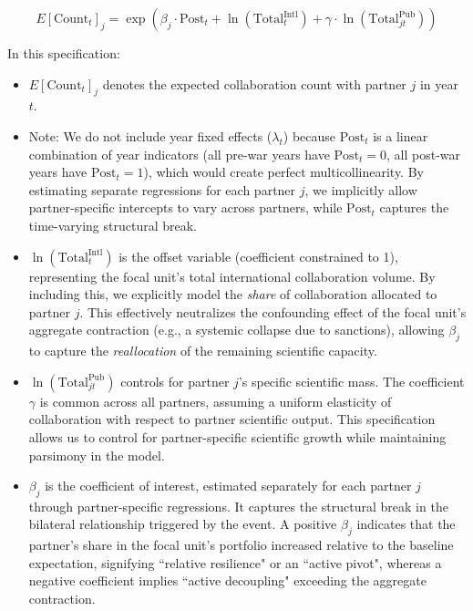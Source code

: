 \begin{equation}\label{eq:gravity_separate}
E[\text{Count}_{t}]_j = \exp\left( \beta_j \cdot \text{Post}_t + \ln(\text{Total}^{\text{Intl}}_{t}) + \gamma \cdot \ln(\text{Total}^{\text{Pub}}_{jt})  \right)
\end{equation}

In this specification:

\begin{itemize}
\item $E[\text{Count}_{t}]_j$ denotes the expected collaboration count with partner $j$ in year $t$.

\item Note: We do not include year fixed effects ($\lambda_t$) because $\text{Post}_t$ is a linear combination of year indicators (all pre-war years have $\text{Post}_t=0$, all post-war years have $\text{Post}_t=1$), which would create perfect multicollinearity. By estimating separate regressions for each partner $j$, we implicitly allow partner-specific intercepts to vary across partners, while $\text{Post}_t$ captures the time-varying structural break.

\item $\ln(\text{Total}^{\text{Intl}}_{t})$ is the offset variable (coefficient constrained to 1), representing the focal unit's total international collaboration volume. By including this, we explicitly model the \textit{share} of collaboration allocated to partner $j$. This effectively neutralizes the confounding effect of the focal unit's aggregate contraction (e.g., a systemic collapse due to sanctions), allowing $\beta_j$ to capture the \textit{reallocation} of the remaining scientific capacity.

\item $\ln(\text{Total}^{\text{Pub}}_{jt})$ controls for partner $j$'s specific scientific mass. The coefficient $\gamma$ is common across all partners, assuming a uniform elasticity of collaboration with respect to partner scientific output. This specification allows us to control for partner-specific scientific growth while maintaining parsimony in the model.

\item $\beta_j$ is the coefficient of interest, estimated separately for each partner $j$ through partner-specific regressions. It captures the structural break in the bilateral relationship triggered by the event. A positive $\beta_j$ indicates that the partner's share in the focal unit's portfolio increased relative to the baseline expectation, signifying ``relative resilience" or an ``active pivot", whereas a negative coefficient implies ``active decoupling" exceeding the aggregate contraction.
\end{itemize}

